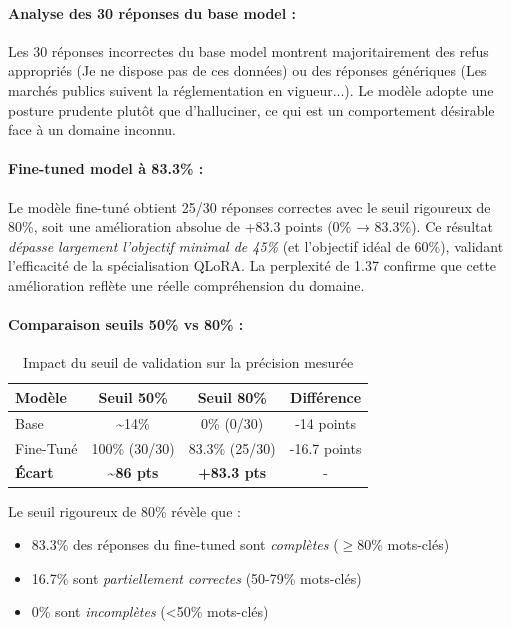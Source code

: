 \paragraph{Analyse des 30 réponses du base model :}
Les 30 réponses incorrectes du base model montrent majoritairement des refus appropriés (\og Je ne dispose pas de ces données\fg{}) ou des réponses génériques (\og Les marchés publics suivent la réglementation en vigueur...\fg{}). Le modèle adopte une posture prudente plutôt que d'halluciner, ce qui est un comportement désirable face à un domaine inconnu.

\paragraph{Fine-tuned model à 83.3\% :}
Le modèle fine-tuné obtient 25/30 réponses correctes avec le seuil rigoureux de 80\%, soit une amélioration absolue de +83.3 points (0\% → 83.3\%). Ce résultat \textit{dépasse largement l'objectif minimal de 45\%} (et l'objectif idéal de 60\%), validant l'efficacité de la spécialisation QLoRA. La perplexité de 1.37 confirme que cette amélioration reflète une réelle compréhension du domaine.

\paragraph{Comparaison seuils 50\% vs 80\% :}
\begin{table}[h]
\centering
\caption{Impact du seuil de validation sur la précision mesurée}
\label{tab:threshold_impact}
\begin{tabular}{@{}lccc@{}}
\toprule
\textbf{Modèle} & \textbf{Seuil 50\%} & \textbf{Seuil 80\%} & \textbf{Différence} \\ \midrule
Base & \textasciitilde{}14\% & 0\% (0/30) & -14 points \\
Fine-Tuné & 100\% (30/30) & 83.3\% (25/30) & -16.7 points \\
\textbf{Écart} & \textbf{\textasciitilde{}86 pts} & \textbf{+83.3 pts} & - \\
\bottomrule
\end{tabular}
\end{table}

Le seuil rigoureux de 80\% révèle que :
\begin{itemize}
    \item 83.3\% des réponses du fine-tuned sont \textit{complètes} ($\geq$80\% mots-clés)
    \item 16.7\% sont \textit{partiellement correctes} (50-79\% mots-clés)
    \item 0\% sont \textit{incomplètes} (<50\% mots-clés)
\end{itemize}

